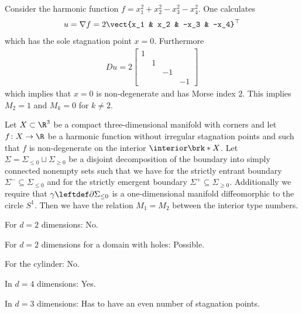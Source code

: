 \begin{frame}
  \begin{example}
    Consider the harmonic function $f=x_1^2+x_2^2-x_3^2-x_4^2$. One calculates
    \begin{align*}
      u=\nabla f = 2\vect{x_1 & x_2 & -x_3 & -x_4}^\top
    \end{align*}
    which has the sole stagnation point $x=0$. Furthermore
    \begin{align*}
      Du=2\begin{bmatrix}
        1 & & & \\
          & 1 & & \\
          & & -1 & \\
          & & & -1
      \end{bmatrix}
    \end{align*}
    which implies that $x=0$ is non-degenerate and has Morse index $2$.
    This implies $M_2=1$ and $M_k=0$ for $k\neq2$.
  \end{example}
\end{frame}


\begin{frame}
  \begin{proposition}\label{pr:n3_inflowOutflowRels}
    Let $X\subset\R^3$ be a compact three-dimensional manifold with corners and
    let $f\colon X\to\R$ be a harmonic function without irregular stagnation points and such that $f$ is non-degenerate on the interior $\interior\brk*{X}$.
    Let $\Sigma=\Sigma_{\leq0}\sqcup\Sigma_{\geq0}$ be a disjoint decomposition of the boundary into simply connected nonempty sets such that
    we have for the strictly entrant boundary $\Sigma^-\subseteq\Sigma_{\leq0}$ and for the strictly emergent boundary
    $\Sigma^+\subseteq\Sigma_{\geq0}$. Additionally we require that $\gamma\leftdef\partial\Sigma_{\leq0}$ is a one-dimensional manifold diffeomorphic to the
    circle $S^1$.
    Then we have the relation $M_1=M_2$ between the interior type numbers.
  \end{proposition}
\end{frame}

\begin{frame}

  {\questionFlowthrough
  \begin{answer}
    \begin{itemize}
      \item For $d=2$ dimensions: No.
      \item For $d=2$ dimensions for a domain with holes: Possible.
      \item For the cylinder: No.
      \item In $d=4$ dimensions: Yes.
        {\item In $d=3$ dimensions: Has to have an even number of stagnation points.}
    \end{itemize}
  \end{answer}}
\end{frame}

